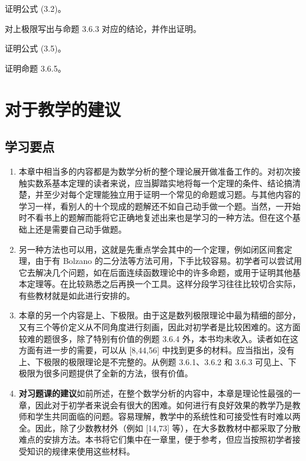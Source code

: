 \begin{xexercise}[8]
证明公式 (3.2)。
\end{xexercise}

\begin{xexercise}[9]
对上极限写出与命题 3.6.3 对应的结论，并作出证明。
\end{xexercise}

\begin{xexercise}[10]
证明公式 (3.5)。
\end{xexercise}

\begin{xexercise}[11]
证明命题 3.6.5。
\end{xexercise}

\section{对于教学的建议}

\subsection{学习要点}

\begin{enumerate}
  \item 本章中相当多的内容都是为数学分析的整个理论展开做准备工作的。对初次接触实数系基本定理的读者来说，应当脚踏实地将每一个定理的条件、结论搞清楚，并至少对每个定理能独立用于证明一个常见的命题或习题。与其他内容的学习一样，看别人的十个现成的题解还不如自己动手做一个题。当然，一开始时不看书上的题解而能将它正确地复述出来也是学习的一种方法。但在这个基础上还是需要自己动手做题。

  \item 另一种方法也可以用，这就是先重点学会其中的一个定理，例如闭区间套定理，由于有 Bolzano 的二分法等方法可用，下手比较容易。初学者可以尝试用它去解决几个问题，如在后面连续函数理论中的许多命题，或用于证明其他基本定理等。在比较熟悉之后再换一个工具。这样分段学习往往比较切合实际，有些教材就是如此进行安排的。

  \item 本章的另一个内容是上、下极限。由于这是数列极限理论中最为精细的部分，又有三个等价定义从不同角度进行刻画，因此对初学者是比较困难的。这方面较难的题很多，除了特别有价值的例题 3.6.4 外，本书均未收入。读者如在这方面有进一步的需要，可以从 [8,44,56] 中找到更多的材料。应当指出，没有上、下极限的极限理论是不完整的。从例题 3.6.1、3.6.2 和 3.6.3 可见上、下极限为很多问题提供了全新的方法，很有价值。

  \item \textbf{对习题课的建议}\quad 如前所述，在整个数学分析的内容中，本章是理论性最强的一章，因此对于初学者来说会有很大的困难。如何进行有良好效果的教学乃是教师和学生共同面临的问题。容易理解，教学中的系统性和可接受性有时难以两全。因此，除了少数教材外（例如 [14,73] 等），在大多数教材中都采取了分散难点的安排方法。本书将它们集中在一章里，便于参考，但应当按照初学者接受知识的规律来使用这些材料。
\end{enumerate}

